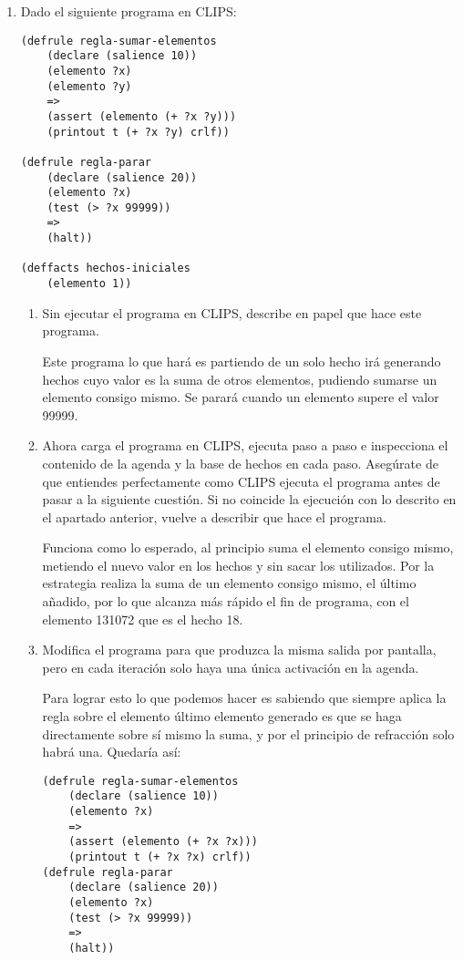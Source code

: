 \documentclass[12pt, spanish, pdftex]{UC3M_document}
\begin{document}
\begin{enumerate}
	\item Dado el siguiente programa en CLIPS:
	      \begin{lstlisting}
(defrule regla-sumar-elementos
    (declare (salience 10))
    (elemento ?x)
    (elemento ?y)
    =>
    (assert (elemento (+ ?x ?y)))
    (printout t (+ ?x ?y) crlf))

(defrule regla-parar
    (declare (salience 20))
    (elemento ?x)
    (test (> ?x 99999))
    =>
    (halt))

(deffacts hechos-iniciales
    (elemento 1))
\end{lstlisting}
	      \begin{enumerate}
		      \item Sin ejecutar el programa en CLIPS, describe en papel que hace este programa.

		            Este programa lo que hará es partiendo de un solo hecho irá generando hechos cuyo valor es la suma de otros elementos, pudiendo sumarse un elemento consigo mismo. Se parará cuando un elemento supere el valor 99999.

		      \item Ahora carga el programa en CLIPS, ejecuta paso a paso e inspecciona el contenido de la agenda y la base de hechos en cada paso. Asegúrate de que entiendes perfectamente como CLIPS ejecuta el programa antes de pasar a la siguiente cuestión. Si no coincide la ejecución con lo descrito en el apartado anterior, vuelve a describir que hace el programa.

		            Funciona como lo esperado, al principio suma el elemento consigo mismo, metiendo el nuevo valor en los hechos y sin sacar los utilizados. Por la estrategia realiza la suma de un elemento consigo mismo, el último añadido, por lo que alcanza más rápido el fin de programa, con el elemento 131072 que es el hecho 18.

		      \item Modifica el programa para que produzca la misma salida por pantalla, pero en cada iteración solo haya una única activación en la agenda.

		            Para lograr esto lo  que podemos hacer es sabiendo que siempre aplica la regla sobre el elemento último elemento generado es que se haga directamente sobre sí mismo la suma, y por el principio de refracción solo habrá una. Quedaría así:
		            \begin{lstlisting}
(defrule regla-sumar-elementos
    (declare (salience 10))
    (elemento ?x)
    =>
    (assert (elemento (+ ?x ?x)))
    (printout t (+ ?x ?x) crlf))
(defrule regla-parar
    (declare (salience 20))
    (elemento ?x)
    (test (> ?x 99999))
    =>
    (halt))


\end{lstlisting}
\end{enumerate}
\end{enumerate}
\end{document}
